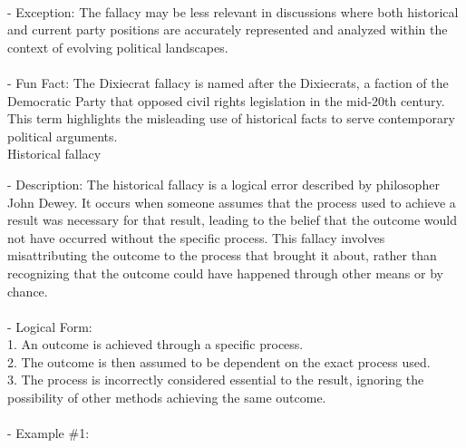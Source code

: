 \documentclass[a4paper,12pt,single,pdftex]{scrartcl}
\begin{document}
    
      
    \\

    
      - Exception: The fallacy may be less relevant in discussions where both historical and current party positions are accurately represented and analyzed within the context of evolving political landscapes.
    \\

    
      
    \\

    
      - Fun Fact: The Dixiecrat fallacy is named after the Dixiecrats, a faction of the Democratic Party that opposed civil rights legislation in the mid-20th century. This term highlights the misleading use of historical facts to serve contemporary political arguments.
    \\

  

Historical fallacy
    
      - Description: The historical fallacy is a logical error described by philosopher John Dewey. It occurs when someone assumes that the process used to achieve a result was necessary for that result, leading to the belief that the outcome would not have occurred without the specific process. This fallacy involves misattributing the outcome to the process that brought it about, rather than recognizing that the outcome could have happened through other means or by chance.
    \\

    
      
    \\

    
      - Logical Form:
    \\

    
        1. An outcome is achieved through a specific process.
    \\

    
        2. The outcome is then assumed to be dependent on the exact process used.
    \\

    
        3. The process is incorrectly considered essential to the result, ignoring the possibility of other methods achieving the same outcome.
    \\

    
      
    \\

    
      - Example \#1:
    \\
\end{document}
